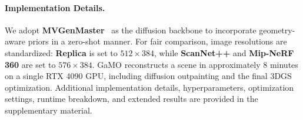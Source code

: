 \documentclass[runningheads]{llncs}
\begin{document}
\paragraph{Implementation Details.}
We adopt \textbf{MVGenMaster}~\cite{cao2025mvgenmaster} as the diffusion backbone to incorporate geometry-aware priors in a zero-shot manner. 
For fair comparison, image resolutions are standardized: \textbf{Replica} is set to $512 \times 384$, while \textbf{ScanNet++} and \textbf{Mip-NeRF 360} are set to $576 \times 384$. 
GaMO reconstructs a scene in approximately 8 minutes on a single RTX 4090 GPU, including diffusion outpainting and the final 3DGS optimization. 
Additional implementation details, hyperparameters, optimization settings, runtime breakdown, and extended results are provided in the supplementary material.
\end{document}

